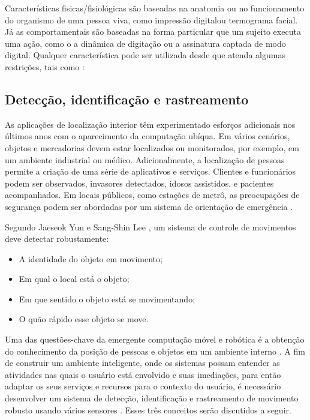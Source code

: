 Características fisicas/fisiológicas são baseadas na anatomia ou no funcionamento do organismo de uma pessoa viva, como impressão digitalou termograma facial. Já as comportamentais são baseadas na forma particular que um sujeito executa uma ação, como o a dinâmica de digitação ou a assinatura captada de modo digital. Qualquer característica pode ser utilizada desde que atenda algumas restrições, tais como \cite{maltoni2009handbook}:



\subsection{Detecção, identificação e rastreamento}\label{sec:deteccao-rastreamento}

As aplicações de localização interior têm experimentado esforços adicionais nos últimos anos com o aparecimento da computação ubíqua. Em vários cenários, objetos e mercadorias devem estar localizados ou monitorados, por exemplo, em um ambiente industrial ou médico. Adicionalmente, a localização de pessoas permite a criação de uma série de aplicativos e serviços. Clientes e funcionários podem ser observados, invasores detectados, idosos assistidos, e pacientes acompanhados. Em locais públicos, como estações de metrô, as preocupações de segurança podem ser abordadas por um sistema de orientação de emergência \cite{linde2006aspects}. 

Segundo Jaeseok Yun e Sang-Shin Lee \cite{yun2014human}, um sistema de controle de movimentos deve detectar robustamente: 
\begin{itemize}
  \item A identidade do objeto em movimento;
  \item Em qual o local está o objeto; 
  \item Em que sentido o objeto está se movimentando;
  \item O quão rápido esse objeto se move. 
 \end{itemize}

Uma das questões-chave da emergente computação móvel e robótica é a obtenção do conhecimento da posição de pessoas e objetos em um ambiente interno \cite{linde2006aspects}. A fim de construir um ambiente inteligente, onde os sistemas possam entender as atividades nas quais o usuário está envolvido e suas imediações, para então adaptar os seus serviços e recursos para o contexto do usuário, é necessário desenvolver um sistema de detecção, identificação e rastreamento de movimento robusto usando vários sensores \cite{yun2014human}. Esses três conceitos serão discutidos a seguir.



